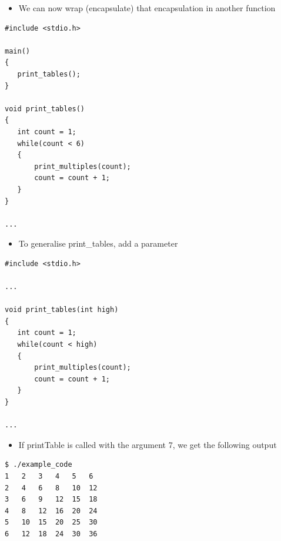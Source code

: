 \documentclass{beamer}
\begin{document}
\begin{frame}[fragile]
\begin{itemize}
\item We can now wrap (encapsulate) that encapsulation in another function
\end{itemize}

\begin{block}{}
\begin{lstlisting}
#include <stdio.h>

main() 
{
   print_tables(); 
}

void print_tables()
{
   int count = 1;
   while(count < 6)
   {
       print_multiples(count);
       count = count + 1;
   } 
}

...
\end{lstlisting}
\end{block}
\end{frame}
 
\begin{frame}[fragile]
\begin{itemize}
\item To generalise print\_tables, add a parameter
\end{itemize}

\begin{block}{}
\begin{lstlisting}
#include <stdio.h>

...

void print_tables(int high)
{
   int count = 1;
   while(count < high)
   {
       print_multiples(count);
       count = count + 1;
   } 
}

...
\end{lstlisting}
\end{block}
\end{frame}

\begin{frame}[fragile]
\begin{itemize}
\item If printTable is called with the argument 7, we get the following output
\end{itemize}

\begin{block}{}
\begin{lstlisting}
$ ./example_code
1	2	3	4	5	6	
2	4	6	8	10	12	
3	6	9	12	15	18	
4	8	12	16	20	24	
5	10	15	20	25	30	
6	12	18	24	30	36
\end{lstlisting}
\end{block}
\end{frame}
\end{document}
